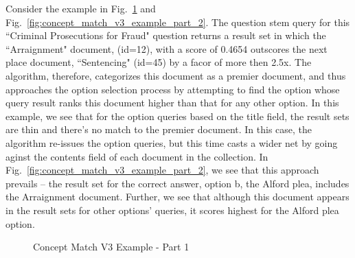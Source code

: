 Consider the example in Fig.~\ref{fig:concept_match_v3_example_part_1} and Fig.~\ref{fig:concept_match_v3_example_part_2}.  The question stem query for this ``Criminal Prosecutions for Fraud" question returns a result set in which the ``Arraignment" document, (id=12), with a score of 0.4654 outscores the next place document, ``Sentencing" (id=45) by a facor of more then 2.5x.  The algorithm, therefore,  categorizes this document as a premier document, and thus approaches the option selection process by attempting to find the option whose query result ranks this document higher than that for any other option.  In this example, we see that for the option queries based on the title field, the result sets are thin and there's no match to the premier document.  In this case, the algorithm re-issues the option queries, but this time casts a wider net by going aginst the contents field of each document in the collection.  In Fig.~\ref{fig:concept_match_v3_example_part_2}, we see that this approach prevails -- the result set for the correct answer, option b, the Alford plea, includes the Arraignment document.  Further, we see that although this document appears in the result sets for other options' queries, it scores highest for the Alford plea option.

\begin{figure}
\centering
\vspace{0.75in}
\caption{Concept Match V3 Example - Part 1}
\label{fig:concept_match_v3_example_part_1}
\end{figure}

